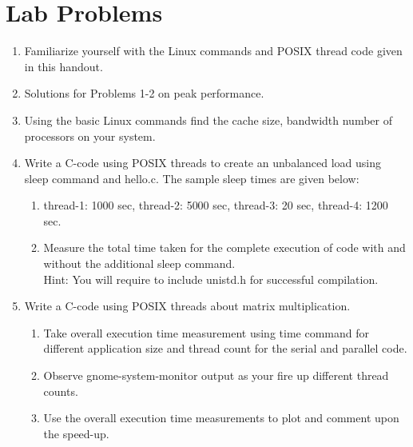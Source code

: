 \documentclass{sem5}
\begin{document}
\section*{Lab Problems}
\begin{enumerate}
\item Familiarize yourself with the Linux commands and POSIX thread code given in this handout.
\item Solutions for Problems 1-2 on peak performance.
\item Using the basic Linux commands find the cache size, bandwidth number of processors on your system.
\item Write a C-code using POSIX threads to create an unbalanced load using sleep command and hello.c. The sample sleep times are given below:
\begin{enumerate}
\item thread-1: 1000 sec, thread-2: 5000 sec, thread-3: 20 sec, thread-4: 1200 sec.
\item Measure the total time taken for the complete execution of code with and without the additional sleep command.\\
Hint: You will require to include unistd.h for successful compilation.
\end{enumerate}
\item Write a C-code using POSIX threads about matrix multiplication.
\begin{enumerate}
\item Take overall execution time measurement using time command for different application size and thread count for the serial and parallel code.
\item Observe gnome-system-monitor output as your fire up different thread counts.
\item Use the overall execution time measurements to plot and comment upon the speed-up.
\end{enumerate}
\end{enumerate}
\end{document}

